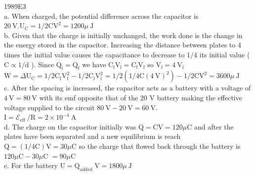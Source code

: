 \begin{enumerate}
1989E3\\
a. When charged, the potential difference across the capacitor is $20 \mathrm{~V} . \mathrm{U}_{\mathrm{C}}=1 / 2 \mathrm{CV}^{2}=1200 \mu \mathrm{~J}$\\
b. Given that the charge is initially unchanged, the work done is the change in the energy stored in the capacitor. Increasing the distance between plates to 4 times the initial value causes the capacitance to decrease to $1 / 4$ its initial value ( $\mathrm{C} \propto 1 / \mathrm{d}$ ). Since $\mathrm{Q}_{\mathrm{i}}=\mathrm{Q}_{\mathrm{f}}$ we have $\mathrm{C}_{\mathrm{i}} \mathrm{V}_{\mathrm{i}}=\mathrm{C}_{\mathrm{f}} \mathrm{V}_{\mathrm{f}}$ so $\mathrm{V}_{\mathrm{f}}=4 \mathrm{~V}_{\mathrm{i}}$ $\mathrm{W}=\Delta \mathrm{U}_{\mathrm{C}}=1 / 2 \mathrm{C}_{\mathrm{f}} \mathrm{V}_{\mathrm{f}}^{2}-1 / 2 \mathrm{C}_{\mathrm{i}} \mathrm{V}_{\mathrm{i}}^{2}=1 / 2\left(1 / 4 \mathrm{C}(4 \mathrm{~V})^{2}\right)-1 / 2 \mathrm{CV}^{2}=3600 \mu \mathrm{~J}$\\
c. After the spacing is increased, the capacitor acts as a battery with a voltage of $4 \mathrm{~V}=80 \mathrm{~V}$ with its emf opposite that of the 20 V battery making the effective voltage supplied to the circuit $80 \mathrm{~V}-20 \mathrm{~V}=60 \mathrm{~V}$.\\
$\mathrm{I}=\boldsymbol{\mathcal { E }}_{\text {eff }} / \mathrm{R}=2 \times 10^{-4} \mathrm{~A}$\\
d. The charge on the capacitor initially was $\mathrm{Q}=\mathrm{CV}=120 \mu \mathrm{C}$ and after the plates have been separated and a new equilibrium is reach $\mathrm{Q}=(1 / 4 \mathrm{C}) \mathrm{V}=30 \mu \mathrm{C}$ so the charge that flowed back through the battery is $120 \mu \mathrm{C}-30 \mu \mathrm{C}$ $=90 \mu \mathrm{C}$\\
e. For the battery $\mathrm{U}=\mathrm{Q}_{\text {added }} \mathrm{V}=1800 \mu \mathrm{~J}$


\end{enumerate}
